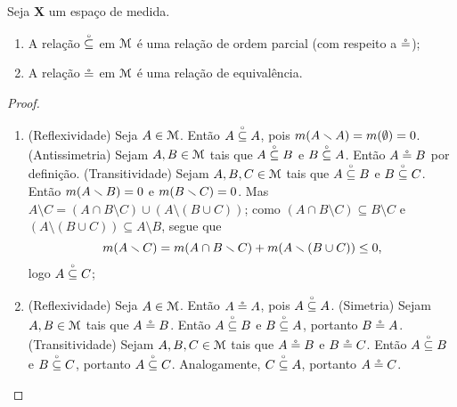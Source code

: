 \begin{proposition}
Seja $\bm X$ um espaço de medida.
	\begin{enumerate}
	\item A relação $\qsubset$ em $\mathcal{M}$
	é uma relação de ordem parcial (com respeito a $\circeq$);
	\item A relação $\circeq$ em $\mathcal{M}$
	é uma relação de equivalência.
	\end{enumerate}
\end{proposition}
\begin{proof}
	\begin{enumerate}
	\item (Reflexividade) Seja $A \in \mathcal{M}$. Então $A \qsubset A$, pois $m(A \smallsetminus A) =m(\emptyset)=0$. (Antissimetria) Sejam $A,B \in \mathcal{M}$ tais que $A \qsubset B$ e $B \qsubset A$. Então $A \circeq B$ por definição. (Transitividade) Sejam $A,B,C \in \mathcal{M}$ tais que $A \qsubset B$ e $B \qsubset C$. Então $m(A \smallsetminus B)=0$ e $m(B \smallsetminus C) = 0$. Mas $A \setminus C = (A \cap B \setminus C) \cup (A \setminus (B \cup C))$; como $(A \cap B \setminus C) \subseteq B \setminus C$ e $(A \setminus (B \cup C)) \subseteq A \setminus B$, segue que
		\begin{equation*}
		m(A \smallsetminus C) = m(A \cap B \smallsetminus C) + m(A \smallsetminus (B \cup C)) \leq 0,
		\end{equation*}
logo $A \qsubset C$;
	
	\item (Reflexividade) Seja $A \in \mathcal{M}$. Então $A \circeq A$, pois $A \qsubset A$. (Simetria) Sejam $A,B \in \mathcal{M}$ tais que $A \circeq B$. Então $A \qsubset B$ e $B \qsubset A$, portanto $B \circeq A$. (Transitividade) Sejam $A,B,C \in \mathcal{M}$ tais que $A \circeq B$ e $B \circeq C$. Então $A \qsubset B$ e $B \qsubset C$, portanto $A \qsubset C$. Analogamente, $C \qsubset A$, portanto $A \circeq C$.

	\end{enumerate}
\end{proof}

